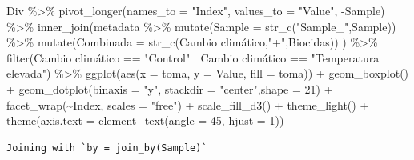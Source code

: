 \documentclass[
  letterpaper,
  DIV=11,
  numbers=noendperiod]{scrartcl}
\newenvironment{Shaded}{\begin{snugshade}}{\end{snugshade}}
\newcommand{\AttributeTok}[1]{\textcolor[rgb]{0.40,0.45,0.13}{#1}}
\newcommand{\DecValTok}[1]{\textcolor[rgb]{0.68,0.00,0.00}{#1}}
\newcommand{\FunctionTok}[1]{\textcolor[rgb]{0.28,0.35,0.67}{#1}}
\newcommand{\NormalTok}[1]{\textcolor[rgb]{0.00,0.23,0.31}{#1}}
\newcommand{\SpecialCharTok}[1]{\textcolor[rgb]{0.37,0.37,0.37}{#1}}
\newcommand{\StringTok}[1]{\textcolor[rgb]{0.13,0.47,0.30}{#1}}
\begin{document}
\begin{Shaded}
\begin{Highlighting}[]
\NormalTok{Div }\SpecialCharTok{\%\textgreater{}\%} 
  \FunctionTok{pivot\_longer}\NormalTok{(}\AttributeTok{names\_to =} \StringTok{"Index"}\NormalTok{, }\AttributeTok{values\_to =} \StringTok{"Value"}\NormalTok{, }\SpecialCharTok{{-}}\NormalTok{Sample) }\SpecialCharTok{\%\textgreater{}\%} 
  \FunctionTok{inner\_join}\NormalTok{(metadata }\SpecialCharTok{\%\textgreater{}\%} 
               \FunctionTok{mutate}\NormalTok{(}\AttributeTok{Sample =} \FunctionTok{str\_c}\NormalTok{(}\StringTok{"Sample\_"}\NormalTok{,Sample)) }\SpecialCharTok{\%\textgreater{}\%} 
               \FunctionTok{mutate}\NormalTok{(}\AttributeTok{Combinada =} \FunctionTok{str\_c}\NormalTok{(}\StringTok{\textasciigrave{}}\AttributeTok{Cambio climático}\StringTok{\textasciigrave{}}\NormalTok{,}\StringTok{"+"}\NormalTok{,Biocidas))}
\NormalTok{             ) }\SpecialCharTok{\%\textgreater{}\%} 
  \FunctionTok{filter}\NormalTok{(}\StringTok{\textasciigrave{}}\AttributeTok{Cambio climático}\StringTok{\textasciigrave{}} \SpecialCharTok{==} \StringTok{"Control"} \SpecialCharTok{|} \StringTok{\textasciigrave{}}\AttributeTok{Cambio climático}\StringTok{\textasciigrave{}} \SpecialCharTok{==} \StringTok{"Temperatura elevada"}\NormalTok{) }\SpecialCharTok{\%\textgreater{}\%} 
  \FunctionTok{ggplot}\NormalTok{(}\FunctionTok{aes}\NormalTok{(}\AttributeTok{x =}\NormalTok{ toma, }\AttributeTok{y =}\NormalTok{ Value, }\AttributeTok{fill =}\NormalTok{ toma)) }\SpecialCharTok{+} 
  \FunctionTok{geom\_boxplot}\NormalTok{() }\SpecialCharTok{+} 
  \FunctionTok{geom\_dotplot}\NormalTok{(}\AttributeTok{binaxis =} \StringTok{"y"}\NormalTok{, }\AttributeTok{stackdir =} \StringTok{"center"}\NormalTok{,}\AttributeTok{shape =} \DecValTok{21}\NormalTok{) }\SpecialCharTok{+}
  \FunctionTok{facet\_wrap}\NormalTok{(}\SpecialCharTok{\textasciitilde{}}\NormalTok{Index, }\AttributeTok{scales =} \StringTok{"free"}\NormalTok{) }\SpecialCharTok{+}
  \FunctionTok{scale\_fill\_d3}\NormalTok{() }\SpecialCharTok{+} 
  \FunctionTok{theme\_light}\NormalTok{() }\SpecialCharTok{+} 
  \FunctionTok{theme}\NormalTok{(}\AttributeTok{axis.text =} \FunctionTok{element\_text}\NormalTok{(}\AttributeTok{angle =} \DecValTok{45}\NormalTok{, }\AttributeTok{hjust =} \DecValTok{1}\NormalTok{))}
\end{Highlighting}
\end{Shaded}

\begin{verbatim}
Joining with `by = join_by(Sample)`
\end{verbatim}
\end{document}
